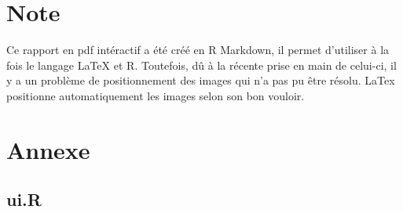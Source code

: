 \documentclass[]{report}
\begin{document}
\null
\newpage

\chapter{Note}\label{note}

Ce rapport en pdf intéractif a été créé en R Markdown, il permet
d'utiliser à la fois le langage LaTeX et R. Toutefois, dû à la récente
prise en main de celui-ci, il y a un problème de positionnement des
images qui n'a pas pu être résolu. LaTex positionne automatiquement les
images selon son bon vouloir.

\chapter{Annexe}\label{annexe}

\section{ui.R}\label{ui.r}
\end{document}
